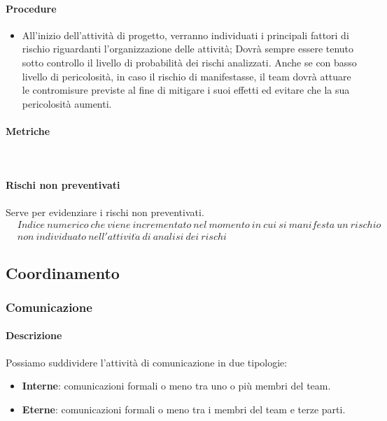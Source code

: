 \documentclass[../NormeDiProgetto_v3.0.0.tex]{subfiles}
\begin{document}
			\paragraph{Procedure}
			\begin{itemize}
			\item All'inizio dell'attività di progetto, verranno individuati i principali fattori di rischio riguardanti l'organizzazione delle attività;
			Dovrà sempre essere tenuto sotto controllo il livello di probabilità dei rischi analizzati. Anche se con basso livello di pericolosità, in caso il rischio di manifestasse, il team dovrà attuare le contromisure previste al fine di mitigare i suoi effetti ed evitare che la sua pericolosità aumenti.
			\end{itemize}
			\paragraph{Metriche}\mbox{}\\
				\paragraph{Rischi non preventivati}
				Serve per evidenziare i rischi non preventivati.
				\begin{equation*}
				\begin{split}
					&Indice \ numerico \ che \ viene \ incrementato \ nel \ momento \ in \ cui \ si \ manifesta \ un \ rischio \\ 
					&non \ individuato \ nell'attivit\grave{a} \ di \ analisi \ dei \ rischi
				\end{split}
				\end{equation*}	
	

	\subsection{Coordinamento}
		\subsubsection{Comunicazione}
			\paragraph{Descrizione}
				Possiamo suddividere l'attività di comunicazione in due tipologie:
				\begin{itemize}
					\item \textbf{Interne}: comunicazioni formali o meno tra uno o più membri del team.
					\item \textbf{Eterne}: comunicazioni formali o meno tra i membri del team e terze parti.
				\end{itemize}
			
\end{document}
